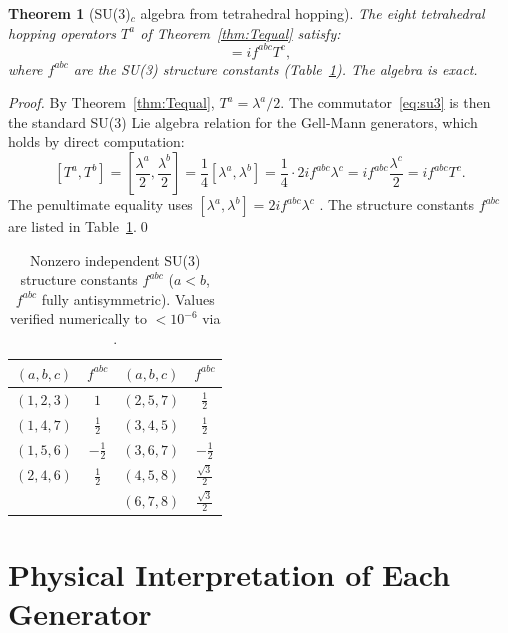 \documentclass[11pt,a4paper]{article}
\newtheorem{theorem}{Theorem}[section]
\begin{document}
\begin{theorem}[SU(3)$_c$ algebra from tetrahedral hopping]
\label{thm:su3}
The eight tetrahedral hopping operators $T^a$ of
Theorem~\ref{thm:Tequal} satisfy:
\begin{equation}
[T^a, T^b] = if^{abc}T^c,
\label{eq:su3}
\end{equation}
where $f^{abc}$ are the SU(3) structure constants
(Table~\ref{tab:fconst}).  The algebra is exact.
\end{theorem}

\begin{proof}
By Theorem~\ref{thm:Tequal}, $T^a = \lambda^a/2$.  The
commutator~\eqref{eq:su3} is then the standard SU(3) Lie algebra
relation for the Gell-Mann generators, which holds by direct
computation:
\[
[T^a, T^b]
= \left[\frac{\lambda^a}{2}, \frac{\lambda^b}{2}\right]
= \frac{1}{4}[\lambda^a, \lambda^b]
= \frac{1}{4}\cdot 2if^{abc}\lambda^c
= if^{abc}\frac{\lambda^c}{2}
= if^{abc}T^c.
\]
The penultimate equality uses $[\lambda^a, \lambda^b] = 2if^{abc}\lambda^c$
\citep{gell-mann1962}.  The structure constants $f^{abc}$ are
listed in Table~\ref{tab:fconst}.\qed
\end{proof}

\begin{table}[H]
\centering
\caption{Nonzero independent SU(3) structure constants $f^{abc}$
  ($a < b$, $f^{abc}$ fully antisymmetric).
  Values verified numerically to $< 10^{-6}$
  via \citep{cpp_ss_mc}.}
\label{tab:fconst}
\begin{tabular}{@{}cccc@{}}
\toprule
$(a,b,c)$ & $f^{abc}$ & $(a,b,c)$ & $f^{abc}$ \\
\midrule
$(1,2,3)$ & $1$ & $(2,5,7)$ & $\tfrac{1}{2}$ \\
$(1,4,7)$ & $\tfrac{1}{2}$ & $(3,4,5)$ & $\tfrac{1}{2}$ \\
$(1,5,6)$ & $-\tfrac{1}{2}$ & $(3,6,7)$ & $-\tfrac{1}{2}$ \\
$(2,4,6)$ & $\tfrac{1}{2}$ & $(4,5,8)$ & $\tfrac{\sqrt{3}}{2}$ \\
& & $(6,7,8)$ & $\tfrac{\sqrt{3}}{2}$ \\
\bottomrule
\end{tabular}
\end{table}

\section{Physical Interpretation of Each Generator}
\end{document}
